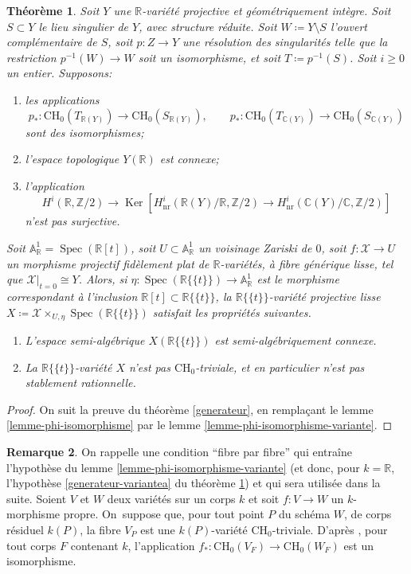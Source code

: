 \documentclass[11pt]{article}
\newenvironment{enumeratei}
{\bgroup\def\theenumi{\roman{enumi}}\def\theenumii{\arabic{enumii}}\begin{enumerate}}
{\end{enumerate}\egroup}
\newenvironment{enumeratea}
{\bgroup\def\theenumi{\alph{enumi}}\begin{enumerate}}
{\end{enumerate}\egroup}
\newcommand{\CH}{\mathrm{CH}}
\newtheorem{thm}{Théorème}[section]
\theoremstyle{definition}
\newtheorem{rmk}[thm]{Remarque}
\newcommand{\C}{\mathbb C}
\newcommand{\Z}{\mathbb Z}
\newcommand{\R}{\mathbb R}
\newcommand{\A}{\mathbb A}
\newcommand{\Spec}{\operatorname{Spec}}
\newcommand{\Ker}{\operatorname{Ker}}
\newcommand{\mc}[1]{\mathcal{#1}}
\newcommand{\on}[1]{\operatorname{#1}}
\newcommand{\puiseux}{\mathbb{R}\{\!\{t\}\!\}}
\begin{document}
\begin{thm}\label{generateur-variante}
Soit $Y$ une $\R$-variété projective et géométriquement intègre. Soit $S\subset Y$ le lieu singulier de $Y$, avec structure réduite. Soit $W\coloneqq Y\setminus S$ l'ouvert complémentaire de $S$, soit $p\colon Z\to Y$ une résolution des singularités telle que la restriction $p^{-1}(W)\to W$ soit un isomorphisme, et soit $T\coloneqq p^{-1}(S)$. Soit $i\geq 0$ un entier. Supposons:

\begin{enumeratea}
\item\label{generateur-variantea}
les applications
\[p_*\colon \CH_0(T_{\R(Y)})\to \CH_0(S_{\R(Y)}),\qquad p_*\colon \CH_0(T_{\C(Y)})\to \CH_0(S_{\C(Y)})\] sont des isomorphismes;
\item\label{generateur-varianteb}
l'espace topologique $Y(\R)$ est connexe;
\item\label{generateur-variantec}
l'application
\[H^i(\R,\Z/2) \to \Ker [H^i_{\on{nr}}(\R(Y)/\R,\Z/2) \to H^i_{\on{nr}}(\C(Y)/\C,\Z/2)]\] n'est pas surjective.
\end{enumeratea}

Soit $\A^1_\R=\Spec(\R[t])$, soit $U\subset \A^1_\R$ un voisinage Zariski de $0$, soit $f\colon \mc{X}\to U$ un morphisme projectif fidèlement plat de $\R$-variétés, à fibre générique lisse, tel que $\mc{X}|_{t=0}\cong Y$. Alors, si $\eta\colon \Spec(\puiseux)\to\A^1_\R$ est le morphisme correspondant à l'inclusion $\R[t]\subset \puiseux$, la $\puiseux$-variété projective lisse $X\coloneqq \mc{X}\times_{U,\eta}\Spec(\puiseux)$ satisfait les propriétés suivantes.

\begin{enumeratei}
\item\label{generateur-variantei}
L'espace semi-algébrique $X(\puiseux)$ est semi-algébriquement connexe.
\item\label{generateur-varianteii}
La $\puiseux$-variété $X$ n'est pas $\CH_0$-triviale, et en particulier
n'est pas stablement rationnelle.
\end{enumeratei}
\end{thm}

\begin{proof}
On suit la preuve du théorème \ref{generateur}, en remplaçant le lemme \ref{lemme-phi-isomorphisme} par le lemme \ref{lemme-phi-isomorphisme-variante}.
\end{proof}

\begin{rmk}\label{fibre-par-fibre}
On rappelle une condition \enquote{fibre par fibre} qui entraîne l'hypothèse du lemme \ref{lemme-phi-isomorphisme-variante} (et donc, pour $k=\R$, l'hypothèse \eqref{generateur-variantea} du théorème \ref{generateur-variante}) et qui sera utilisée dans la suite. Soient $V$ et $W$ deux variétés sur un corps $k$ et soit $f\colon V\to W$ un $k$-morphisme propre. On~suppose que, pour tout point $P$ du schéma $W$, de corps résiduel $k(P)$, la fibre $V_P$ est une $k(P)$-variété $\CH_0$-triviale. D'après \cite[Prop.\,1.8]{colliot2016hypersurfaces}, pour tout corps $F$ contenant $k$, l'application $f_*\colon \CH_0(V_F)\to \CH_0(W_F)$ est un isomorphisme.
\end{rmk}
\end{document}
